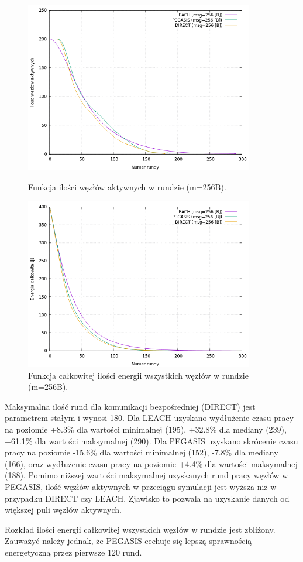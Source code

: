 \documentclass[a4paper,12pt,twoside,openany]{report}
\begin{document}
\begin{figure}[H]
 \centering
 \includegraphics[width=10cm]{images/gnuplot/test_1/nodes_in_round_m256.png}
 \caption{Funkcja ilości węzłów aktywnych w rundzie (m=256B).}
 \includegraphics[width=10cm]{images/gnuplot/test_1/energy_in_round_m256.png}
 \caption{Funkcja całkowitej ilości energii wszystkich węzłów w rundzie (m=256B).}
\end{figure}

\par
Maksymalna ilość rund dla komunikacji bezpośredniej (DIRECT) jest parametrem stałym i wynosi 180.
Dla LEACH uzyskano wydłużenie czasu pracy na poziomie +8.3\% dla wartości minimalnej (195), +32.8\% dla mediany (239), +61.1\% dla wartości maksymalnej (290).
Dla PEGASIS uzyskano skrócenie czasu pracy na poziomie -15.6\% dla wartości minimalnej (152), -7.8\% dla mediany (166), oraz wydłużenie czasu pracy na poziomie +4.4\% dla wartości maksymalnej (188).
Pomimo niższej wartości maksymalnej uzyskanych rund pracy węzłów w PEGASIS, ilość węzłów aktywnych w przeciągu symulacji jest wyższa niż w przypadku DIRECT czy LEACH.
Zjawisko to pozwala na uzyskanie danych od większej puli węzłów aktywnych.
\par
Rozkład ilości energii całkowitej wszystkich węzłów w rundzie jest zbliżony.
Zauważyć należy jednak, że PEGASIS cechuje się lepszą sprawnością energetyczną przez pierwsze 120 rund.
\end{document}
